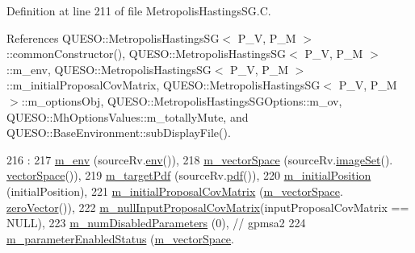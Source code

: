 Definition at line 211 of file Metropolis\-Hastings\-S\-G.\-C.



References Q\-U\-E\-S\-O\-::\-Metropolis\-Hastings\-S\-G$<$ P\-\_\-\-V, P\-\_\-\-M $>$\-::common\-Constructor(), Q\-U\-E\-S\-O\-::\-Metropolis\-Hastings\-S\-G$<$ P\-\_\-\-V, P\-\_\-\-M $>$\-::m\-\_\-env, Q\-U\-E\-S\-O\-::\-Metropolis\-Hastings\-S\-G$<$ P\-\_\-\-V, P\-\_\-\-M $>$\-::m\-\_\-initial\-Proposal\-Cov\-Matrix, Q\-U\-E\-S\-O\-::\-Metropolis\-Hastings\-S\-G$<$ P\-\_\-\-V, P\-\_\-\-M $>$\-::m\-\_\-options\-Obj, Q\-U\-E\-S\-O\-::\-Metropolis\-Hastings\-S\-G\-Options\-::m\-\_\-ov, Q\-U\-E\-S\-O\-::\-Mh\-Options\-Values\-::m\-\_\-totally\-Mute, and Q\-U\-E\-S\-O\-::\-Base\-Environment\-::sub\-Display\-File().


\begin{DoxyCode}
216   :
217   \hyperlink{class_q_u_e_s_o_1_1_metropolis_hastings_s_g_ac8ea061e55b920e0c8f9bce5c3f20e52}{m\_env}                       (sourceRv.\hyperlink{class_q_u_e_s_o_1_1_base_vector_r_v_ad5bf8486b3bacb46b9d4ecba513fd37b}{env}()),
218   \hyperlink{class_q_u_e_s_o_1_1_metropolis_hastings_s_g_a2ef17fbfc6a156f03bbfad044b5a75f5}{m\_vectorSpace}               (sourceRv.\hyperlink{class_q_u_e_s_o_1_1_base_vector_r_v_aa4dd2f036228eac1f945bacc7147a922}{imageSet}().
      \hyperlink{class_q_u_e_s_o_1_1_vector_set_a923421590baf5bf93cf066e528f927dc}{vectorSpace}()),
219   \hyperlink{class_q_u_e_s_o_1_1_metropolis_hastings_s_g_a42ce4ffcb3addf62dd3f19fe8bb09268}{m\_targetPdf}                 (sourceRv.\hyperlink{class_q_u_e_s_o_1_1_base_vector_r_v_a3206740e05e0c64a88273029e963b185}{pdf}()),
220   \hyperlink{class_q_u_e_s_o_1_1_metropolis_hastings_s_g_ae29f5d1198228858283d733021da2b14}{m\_initialPosition}           (initialPosition),
221   \hyperlink{class_q_u_e_s_o_1_1_metropolis_hastings_s_g_a4d9862afbafb34921e91de3d4610c6cd}{m\_initialProposalCovMatrix}  (\hyperlink{class_q_u_e_s_o_1_1_metropolis_hastings_s_g_a2ef17fbfc6a156f03bbfad044b5a75f5}{m\_vectorSpace}.
      \hyperlink{class_q_u_e_s_o_1_1_vector_space_a92e963bb5cab3eecd290dfe4b8f03b04}{zeroVector}()),
222   \hyperlink{class_q_u_e_s_o_1_1_metropolis_hastings_s_g_a416c5ed0c8520d23a479d4a6d3c3c083}{m\_nullInputProposalCovMatrix}(inputProposalCovMatrix == NULL),
223   \hyperlink{class_q_u_e_s_o_1_1_metropolis_hastings_s_g_a43a883aa28c81ed99e5f0cd9de93889b}{m\_numDisabledParameters}     (0), \textcolor{comment}{// gpmsa2}
224   \hyperlink{class_q_u_e_s_o_1_1_metropolis_hastings_s_g_afce8eeadae98935c72727b3640e88a31}{m\_parameterEnabledStatus}    (\hyperlink{class_q_u_e_s_o_1_1_metropolis_hastings_s_g_a2ef17fbfc6a156f03bbfad044b5a75f5}{m\_vectorSpace}.

\end{DoxyCode}
